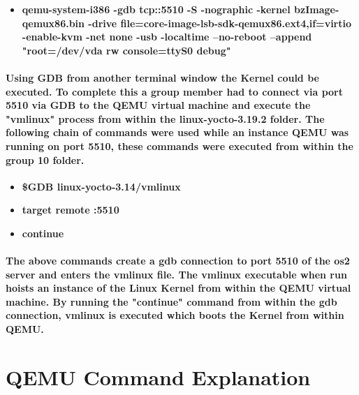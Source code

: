 \documentclass[10pt,onecolumn,draftclsnofoot]{article} %
\begin{document}
  \begin{itemize}
    \item \textbf{qemu-system-i386 -gdb tcp::5510 -S -nographic -kernel bzImage-qemux86.bin -drive file=core-image-lsb-sdk-qemux86.ext4,if=virtio -enable-kvm -net none -usb -localtime --no-reboot --append "root=/dev/vda rw console=ttyS0 debug"}
  \end{itemize}

  \paragraph{\normalfont Using GDB from another terminal window the Kernel could be executed. To complete this a group member had to connect via port 5510 via GDB to the QEMU virtual machine and execute the "vmlinux" process from within the linux-yocto-3.19.2 folder. The following chain of commands were used while an instance QEMU was running on port 5510, these commands were executed from within the group 10 folder.
  }

  \begin{itemize}
    \item \textbf{\$GDB linux-yocto-3.14/vmlinux}
    \item \textbf{target remote :5510}
    \item \textbf{continue}
  \end{itemize}

  \paragraph{\normalfont The above commands create a gdb connection to port 5510 of the os2 server and enters the vmlinux file. The vmlinux executable when run hoists an instance of the Linux Kernel from within the QEMU virtual machine. By running the "continue" command from within the gdb connection, vmlinux is executed which boots the Kernel from within QEMU.
  }

\section{\bf  QEMU Command Explanation}

\restoregeometry
\end{document}
